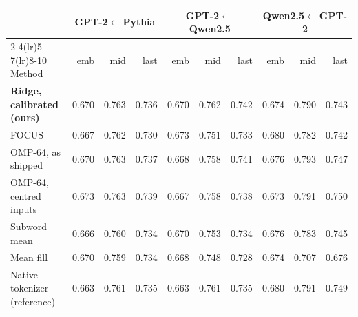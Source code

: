 \begin{tabular}{lrrrrrrrrr}
\toprule
 & \multicolumn{3}{c}{GPT-2$\leftarrow$Pythia} & \multicolumn{3}{c}{GPT-2$\leftarrow$Qwen2.5} & \multicolumn{3}{c}{Qwen2.5$\leftarrow$GPT-2} \\
\cmidrule(lr){2-4}\cmidrule(lr){5-7}\cmidrule(lr){8-10}
Method & emb & mid & last & emb & mid & last & emb & mid & last \\
\midrule
\textbf{Ridge, calibrated (ours)} & 0.670 & 0.763 & 0.736 & 0.670 & 0.762 & 0.742 & 0.674 & 0.790 & 0.743 \\
FOCUS & 0.667 & 0.762 & 0.730 & 0.673 & 0.751 & 0.733 & 0.680 & 0.782 & 0.742 \\
OMP-64, as shipped & 0.670 & 0.763 & 0.737 & 0.668 & 0.758 & 0.741 & 0.676 & 0.793 & 0.747 \\
OMP-64, centred inputs & 0.673 & 0.763 & 0.739 & 0.667 & 0.758 & 0.738 & 0.673 & 0.791 & 0.750 \\
Subword mean & 0.666 & 0.760 & 0.734 & 0.670 & 0.753 & 0.734 & 0.676 & 0.783 & 0.745 \\
Mean fill & 0.670 & 0.759 & 0.734 & 0.668 & 0.748 & 0.728 & 0.674 & 0.707 & 0.676 \\
Native tokenizer (reference) & 0.663 & 0.761 & 0.735 & 0.663 & 0.761 & 0.735 & 0.680 & 0.791 & 0.749 \\
\bottomrule
\end{tabular}
